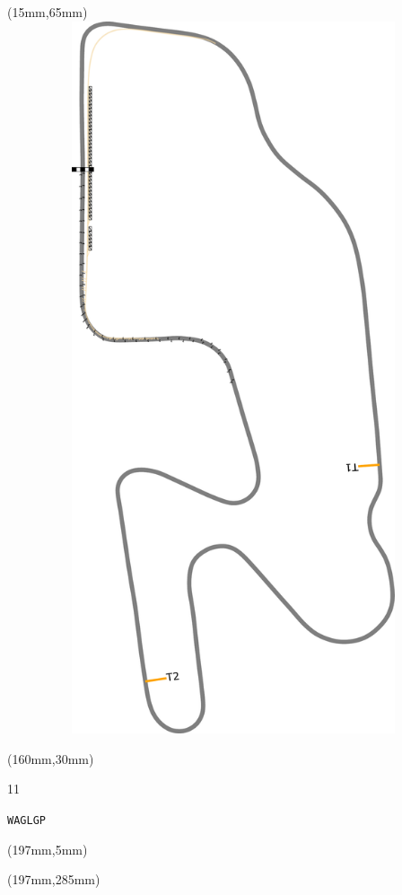 \begin{textblock*}{185mm}(15mm,65mm)%
\centering
\mbox{\includegraphics[width=185mm,height=210mm,keepaspectratio]{PT/WAGLGP.pdf}}
\end{textblock*}
\begin{textblock*}{40mm}(160mm,30mm)%
\Large
\par{} 
\par11 
\par\hfill\tiny\tt WAGLGP\\
\end{textblock*}
\begin{textblock*}{20mm}(197mm,5mm)%
\fbox{\thepage}
\label{WAGLGP}
\end{textblock*}
\begin{textblock*}{20mm}(197mm,285mm)%
\fbox{\thepage}
\end{textblock*}

